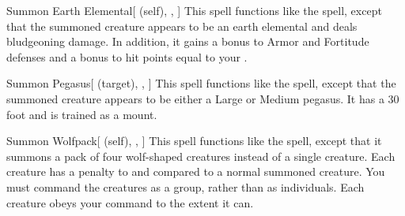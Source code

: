 \lowercase{\hypertarget{spell:Summon Earth Elemental}{}}\label{spell:Summon Earth Elemental}
\begin{attuneability}[\nth{3}]{\hypertarget{spell:Summon Earth Elemental}{Summon Earth Elemental}}[ (self), , ]
This spell functions like the  spell, except that the summoned creature appears to be an earth elemental and deals bludgeoning damage.
In addition, it gains a  bonus to Armor and Fortitude defenses and a bonus to hit points equal to your .
\end{attuneability}
\vspace{0.25em}



\lowercase{\hypertarget{spell:Summon Pegasus}{}}\label{spell:Summon Pegasus}
\begin{attuneability}[\nth{4}]{\hypertarget{spell:Summon Pegasus}{Summon Pegasus}}[ (target), , ]
This spell functions like the  spell, except that the summoned creature appears to be either a Large or Medium pegasus.
It has a 30 foot  and is trained as a mount.
\end{attuneability}
\vspace{0.25em}



\lowercase{\hypertarget{spell:Summon Wolfpack}{}}\label{spell:Summon Wolfpack}
\begin{attuneability}[\nth{4}]{\hypertarget{spell:Summon Wolfpack}{Summon Wolfpack}}[ (self), , ]
This spell functions like the  spell, except that it summons a pack of four wolf-shaped creatures instead of a single creature.
Each creature has a  penalty to  and  compared to a normal summoned creature.
You must command the creatures as a group, rather than as individuals.
Each creature obeys your command to the extent it can.
\end{attuneability}
\vspace{0.25em}



